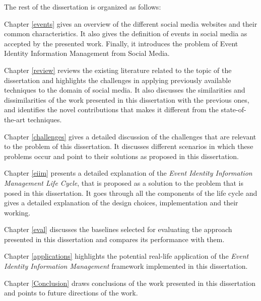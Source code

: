 %
%
%
%

The rest of the dissertation is organized as follows:

Chapter \ref{events} gives an overview of the different social media websites and their common characteristics. It also gives the definition of events in social media as accepted by the presented work. Finally, it introduces the problem of Event Identity Information Management from Social Media.

Chapter \ref{review} reviews the existing literature related to the topic of the dissertation and highlights the challenges in applying previously available techniques to the domain of social media. It also discusses the similarities and dissimilarities of the work presented in this dissertation with the previous ones, and identifies the novel contributions that makes it different from the state-of-the-art techniques.

Chapter \ref{challenges} gives a detailed discussion of the challenges that are relevant to the problem of this dissertation. It discusses different scenarios in which these problems occur and point to their solutions as proposed in this dissertation.


Chapter \ref{eiim} presents a detailed explanation of the \textit{Event Identity Information Management Life Cycle}, that is proposed as a solution to the problem that is posed in this dissertation. It goes through all the components of the life cycle and gives a detailed explanation of the design choices, implementation and their working.

Chapter \ref{eval} discusses the baselines selected for evaluating the approach presented in this dissertation and compares its performance with them. 

Chapter \ref{applications} highlights the potential real-life application of the \textit{Event Identity Information Management} framework implemented in this dissertation. 

Chapter \ref{Conclusion} draws conclusions of the work presented in this dissertation and points to future directions of the work.
